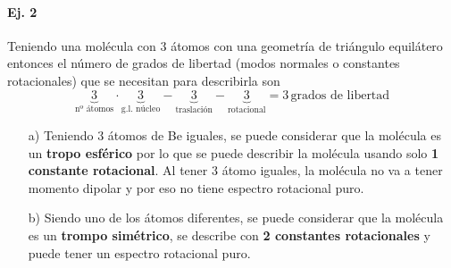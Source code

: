 \documentclass{article}
\begin{document}
\paragraph{Ej. 2}

Teniendo una molécula con 3 átomos con una geometría de triángulo equilátero entonces el número de grados de libertad (modos normales o constantes rotacionales) que se necesitan para describirla son
\[
    \underbrace{3}_{\text{nº átomos}}\cdot\underbrace{3}_{\text{g.l. núcleo}}-\underbrace{3}_{\text{traslación}}-\underbrace{3}_{\text{rotacional}}=3\,\text{grados de libertad}
\]
\begin{enumerate}
    \item[a)] {
    Teniendo 3 átomos de Be iguales, se puede considerar que la molécula es un \textbf{tropo esférico} por lo que se puede describir la molécula usando solo \textbf{1 constante rotacional}. Al tener 3 átomo iguales, la molécula no va a tener momento dipolar y por eso no tiene espectro rotacional puro.
    }

    \item[b)] {
    Siendo uno de los átomos diferentes, se puede considerar que la molécula es un \textbf{trompo simétrico}, se describe con \textbf{2 constantes rotacionales} y puede tener un espectro rotacional puro.
    }
\end{enumerate}
\end{document}
